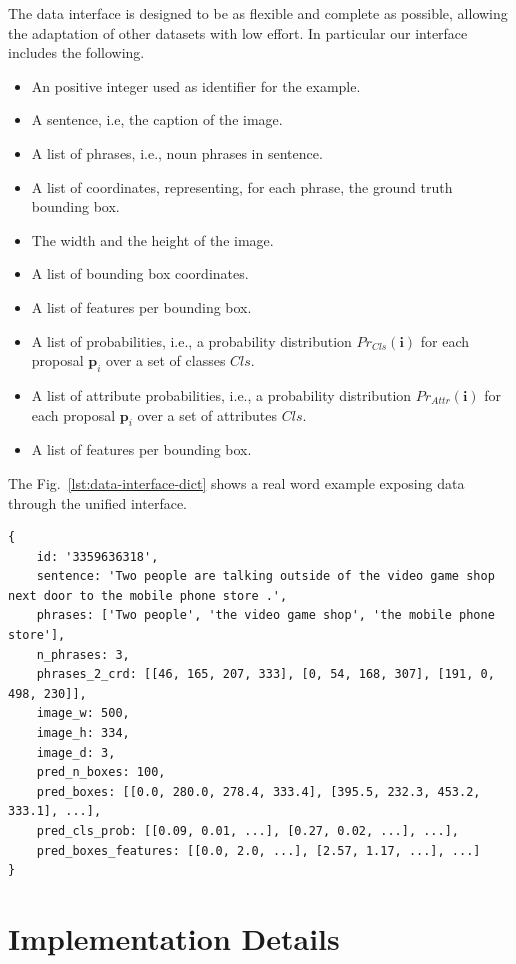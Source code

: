 The data interface is designed to be as flexible and complete as
possible, allowing the adaptation of other datasets with low effort.
In particular our interface includes the following.

\begin{itemize}
  \item An positive integer used as identifier for the example.
  \item A sentence, i.e, the caption of the image.
  \item A list of phrases, i.e., noun phrases in sentence.
  \item A list of coordinates, representing, for each phrase, the
  ground truth bounding box.
  \item The width and the height of the image.
  \item A list of bounding box coordinates.
  \item A list of features per bounding box.
  \item A list of probabilities, i.e., a probability distribution
  $Pr_{Cls}(\bm{i})$ for each proposal $\bm{p}_i$ over a set of
  classes $Cls$.
  \item A list of attribute probabilities, i.e., a probability
  distribution $Pr_{Attr}(\bm{i})$ for each proposal $\bm{p}_i$ over a
  set of attributes $Cls$.
  \item A list of features per bounding box.
\end{itemize}

The Fig.~\ref{lst:data-interface-dict} shows a real word example
exposing data through the unified interface.

\begin{lstlisting}[style=simplepython,caption=Example of our data structure for as interface to row data,label={lst:data-interface-dict}]
{
    id: '3359636318', 
    sentence: 'Two people are talking outside of the video game shop next door to the mobile phone store .', 
    phrases: ['Two people', 'the video game shop', 'the mobile phone store'], 
    n_phrases: 3, 
    phrases_2_crd: [[46, 165, 207, 333], [0, 54, 168, 307], [191, 0, 498, 230]], 
    image_w: 500, 
    image_h: 334, 
    image_d: 3, 
    pred_n_boxes: 100, 
    pred_boxes: [[0.0, 280.0, 278.4, 333.4], [395.5, 232.3, 453.2, 333.1], ...], 
    pred_cls_prob: [[0.09, 0.01, ...], [0.27, 0.02, ...], ...],
    pred_boxes_features: [[0.0, 2.0, ...], [2.57, 1.17, ...], ...]
}
\end{lstlisting}

\section{Implementation Details}
\label{sec:impl-details}

